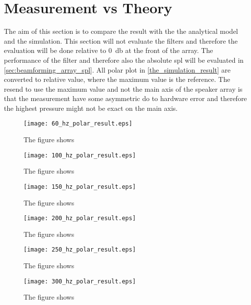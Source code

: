 \section{Measurement vs Theory}\label{sec:meas_vs_theory}

The aim of this section is to compare the result with the the analytical model and the simulation. This section will not evaluate the filters and therefore the evaluation will be done relative to \SI{0}{\decibel} at the front of the array. The performance of the filter and therefore also the absolute \gls{spl} will be evaluated in \autoref{sec:beamforming_array_spl}. All polar plot in \autoref{the_simulation_result} are converted to relative value, where the maximum value is the reference. The resend to use the maximum value and not the main axis of the speaker array is that the measurement have some asymmetric do to hardware error and therefore the highest pressure might not be exact on the main axis. 



 \begin{figure}[H]
	\centering
	\texttt{[image: 60\_hz\_polar\_result.eps]}
	\caption{The figure shows}
		\label{fig:60_hz_polar_result}
\end{figure}

 \begin{figure}[H]
	\centering
	\texttt{[image: 100\_hz\_polar\_result.eps]}
	\caption{The figure shows}
		\label{fig:100_hz_polar_result}
\end{figure}

 \begin{figure}[H]
	\centering
	\texttt{[image: 150\_hz\_polar\_result.eps]}
	\caption{The figure shows}
		\label{fig:150_hz_polar_result}
\end{figure}

 \begin{figure}[H]
	\centering
	\texttt{[image: 200\_hz\_polar\_result.eps]}
	\caption{The figure shows}
		\label{fig:200_hz_polar_result}
\end{figure}


 \begin{figure}[H]
	\centering
	\texttt{[image: 250\_hz\_polar\_result.eps]}
	\caption{The figure shows}
		\label{fig:250_hz_polar_result}
\end{figure}

 \begin{figure}[H]
	\centering
	\texttt{[image: 300\_hz\_polar\_result.eps]}
	\caption{The figure shows}
		\label{fig:300_hz_polar_result}
\end{figure}







